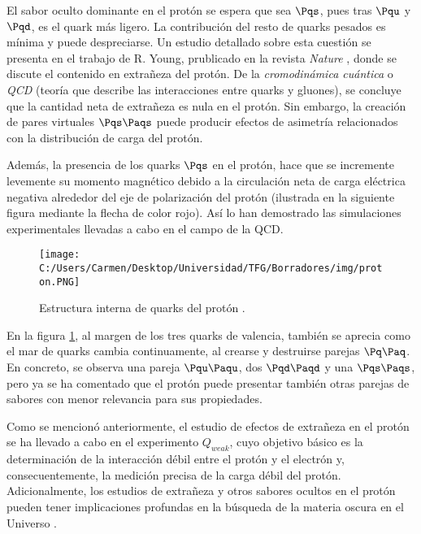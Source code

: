 El sabor oculto dominante en el protón se espera que sea $\Pqs$, pues tras $\Pqu$ y $\Pqd$, es el quark más ligero. La contribución del resto de quarks pesados es mínima y puede despreciarse. Un estudio detallado sobre esta cuestión se presenta en el trabajo de R. Young, prublicado en la revista \textit{Nature} \cite{protonYoung}, donde se discute el contenido en extrañeza del protón. De la \textit{cromodinámica cuántica} o \textit{QCD} (teoría que describe las interacciones entre quarks y gluones), se concluye que la cantidad neta de extrañeza es nula en el protón. Sin embargo, la creación de pares virtuales $\Pqs\Paqs$ puede producir efectos de asimetría relacionados con la distribución de carga del protón.

Además, la presencia de los quarks $\Pqs$ en el protón, hace que se incremente levemente su momento magnético debido a la circulación neta de carga eléctrica negativa alrededor del eje de polarización del protón (ilustrada en la siguiente figura mediante la flecha de color rojo). Así lo han demostrado las simulaciones experimentales llevadas a cabo en el campo de la QCD.

\begin{figure}[h!]
	\centering
	\texttt{[image: C:/Users/Carmen/Desktop/Universidad/TFG/Borradores/img/proton.PNG]}
	\caption[Estructura interna del protón]
	{Estructura interna de quarks del protón \cite{protonYoung}.}
	\label{fig:proton}
\end{figure}

En la figura \ref{fig:proton}, al margen de los tres quarks de valencia, también se aprecia como el mar de quarks cambia continuamente, al crearse y destruirse parejas $\Pq\Paq$. En concreto, se observa una pareja $\Pqu\Paqu$, dos $\Pqd\Paqd$ y una $\Pqs\Paqs$, pero ya se ha comentado que el protón puede presentar también otras parejas de sabores con menor relevancia para sus propiedades. 

Como se mencionó anteriormente, el estudio de efectos de extrañeza en el protón se ha llevado a cabo en el experimento $Q_{weak}$, cuyo objetivo básico es la determinación de la interacción débil entre el protón y el electrón y, consecuentemente, la medición precisa de la carga débil del protón. Adicionalmente, los estudios de extrañeza y otros sabores ocultos en el protón pueden tener implicaciones profundas en la búsqueda de la materia oscura en el Universo \cite{protonYoung}. 
